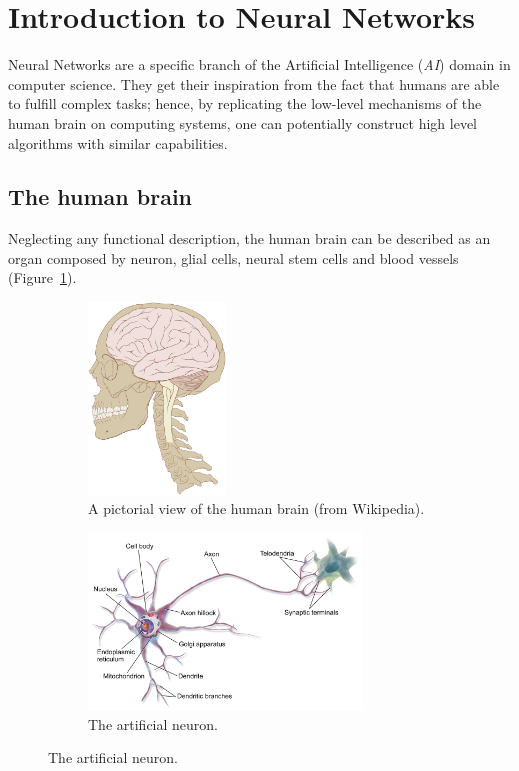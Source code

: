 \section{Introduction to Neural Networks}
Neural Networks are a specific branch of the Artificial Intelligence (\emph{AI}) domain in computer science.
They get their inspiration from the fact that humans are able to fulfill complex tasks; hence, by replicating the low-level mechanisms of the human brain on computing systems, one can potentially construct high level algorithms with similar capabilities.

\subsection{The human brain}
Neglecting any functional description, the human brain can be described as an organ composed by neuron, glial cells, neural stem cells and blood vessels (Figure~\ref{fig:humanbrain}).
\begin{figure}[h]
    \centering
    \begin{subfigure}[b]{0.35\textwidth}
    \centering
    \includegraphics[width=0.4\textwidth]{images/humanbrain.png}
    \caption{A pictorial view of the human brain (from Wikipedia).}
    \label{fig:humanbrain}
    \end{subfigure}
    \hfill
        \begin{subfigure}[b]{0.55\textwidth}
        \includegraphics[width=0.8\textwidth]{images/Blausen_0657_MultipolarNeuron.png}
     \caption{The artificial neuron.}
     \label{fig:neuron}
        \end{subfigure}

\end{figure}
